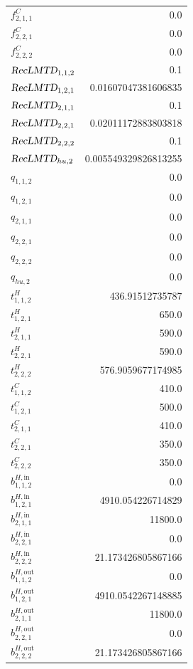 \documentclass{article}%
\begin{document}
\begin{multicols*}{3}
\begin{supertabular}{lr}
	$f_{2,1,1}^{C}$ & 0.0 \\%
	$f_{2,2,1}^{C}$ & 0.0 \\%
	$f_{2,2,2}^{C}$ & 0.0 \\%
	$\textsl{RecLMTD}_{1,1,2}$ & 0.1 \\%
	$\textsl{RecLMTD}_{1,2,1}$ & 0.01607047381606835 \\%
	$\textsl{RecLMTD}_{2,1,1}$ & 0.1 \\%
	$\textsl{RecLMTD}_{2,2,1}$ & 0.02011172883803818 \\%
	$\textsl{RecLMTD}_{2,2,2}$ & 0.1 \\%
	$\textsl{RecLMTD}_{hu,2}$ & 0.005549329826813255 \\%
	$q_{1,1,2}$ & 0.0 \\%
	$q_{1,2,1}$ & 0.0 \\%
	$q_{2,1,1}$ & 0.0 \\%
	$q_{2,2,1}$ & 0.0 \\%
	$q_{2,2,2}$ & 0.0 \\%
	$q_{hu,2}$ & 0.0 \\%
	$t_{1,1,2}^{H}$ & 436.91512735787 \\%
	$t_{1,2,1}^{H}$ & 650.0 \\%
	$t_{2,1,1}^{H}$ & 590.0 \\%
	$t_{2,2,1}^{H}$ & 590.0 \\%
	$t_{2,2,2}^{H}$ & 576.9059677174985 \\%
	$t_{1,1,2}^{C}$ & 410.0 \\%
	$t_{1,2,1}^{C}$ & 500.0 \\%
	$t_{2,1,1}^{C}$ & 410.0 \\%
	$t_{2,2,1}^{C}$ & 350.0 \\%
	$t_{2,2,2}^{C}$ & 350.0 \\%
	$b_{1,1,2}^{H,\text{in}}$ & 0.0 \\%
	$b_{1,2,1}^{H,\text{in}}$ & 4910.054226714829 \\%
	$b_{2,1,1}^{H,\text{in}}$ & 11800.0 \\%
	$b_{2,2,1}^{H,\text{in}}$ & 0.0 \\%
	$b_{2,2,2}^{H,\text{in}}$ & 21.173426805867166 \\%
	$b_{1,1,2}^{H,\text{out}}$ & 0.0 \\%
	$b_{1,2,1}^{H,\text{out}}$ & 4910.0542267148885 \\%
	$b_{2,1,1}^{H,\text{out}}$ & 11800.0 \\%
	$b_{2,2,1}^{H,\text{out}}$ & 0.0 \\%
	$b_{2,2,2}^{H,\text{out}}$ & 21.173426805867166 \\%

\end{supertabular}
\end{multicols*}
\end{document}

